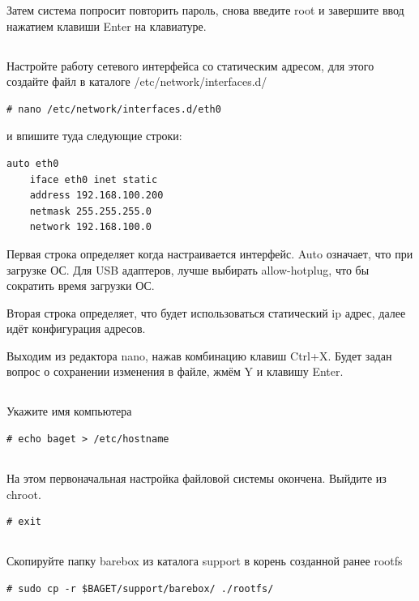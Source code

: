 Затем система попросит повторить пароль, снова введите root и завершите ввод нажатием клавиши Enter на клавиатуре.

\subsection{} Настройте работу сетевого интерфейса со статическим адресом, для этого создайте файл в каталоге /etc/network/interfaces.d/

\begin{lstlisting}[style=bash]
# nano /etc/network/interfaces.d/eth0
\end{lstlisting}
и впишите туда следующие строки:

\begin{lstlisting}[style=stdout]
auto eth0
	iface eth0 inet static
	address 192.168.100.200
	netmask 255.255.255.0
	network 192.168.100.0
\end{lstlisting}

Первая строка определяет когда настраивается интерфейс. Auto означает, что при загрузке ОС. 
Для USB адаптеров, лучше выбирать allow-hotplug, что бы сократить время загрузки ОС. 

Вторая строка определяет, что будет использоваться статический ip адрес, 
далее идёт конфигурация адресов.

Выходим из редактора nano, нажав комбинацию клавиш Ctrl+X. Будет задан вопрос о сохранении изменения в файле, жмём Y и клавишу Enter.

\subsection{} Укажите имя компьютера

\begin{lstlisting}[style=bash]
# echo baget > /etc/hostname
\end{lstlisting}

\subsection{} На этом первоначальная настройка файловой системы окончена. Выйдите из chroot. 

\begin{lstlisting}[style=bash]
# exit
\end{lstlisting}

\subsection{} Скопируйте папку barebox из каталога support в корень созданной ранее rootfs
\begin{lstlisting}[style=bash]
# sudo cp -r $BAGET/support/barebox/ ./rootfs/
\end{lstlisting}

